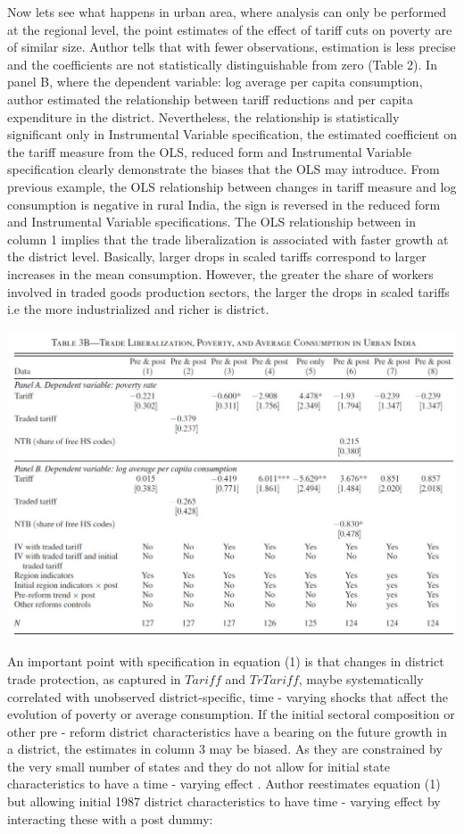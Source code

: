 \documentclass[a4paper,12pt]{article}
\begin{document}
Now lets see what happens in urban area, where analysis can only be performed at the regional level, the point estimates of the effect of  tariff cuts on poverty are of similar size. Author tells that with fewer observations, estimation is less precise and the coefficients are not statistically distinguishable from zero (Table 2). In panel B, where the dependent variable: log average per capita consumption, author estimated the relationship between tariff reductions and per capita expenditure in the district. Nevertheless, the relationship is statistically significant only in Instrumental Variable specification, the estimated coefficient on the tariff measure from the OLS, reduced form and Instrumental Variable specification clearly demonstrate the biases that the OLS may introduce. From previous example, the OLS relationship between changes in tariff measure and log consumption is negative in rural India, the sign is reversed in the reduced form and Instrumental Variable specifications. The OLS relationship between in column 1 implies that the trade liberalization is associated with faster growth at the district level. Basically, larger drops in scaled tariffs correspond to larger increases in the mean consumption. However, the greater the share of workers involved in traded goods production sectors, the larger the drops in scaled tariffs i.e the more industrialized and richer is district. 

\begin{table}[h]
\centering
\includegraphics[width=1\textwidth]{table3b.JPG}
\caption{\label{fig:Figure1}}
\end{table}


An important point with specification in equation (1) is that changes in district trade protection, as captured in $Tariff$ and $TrTariff$, maybe systematically correlated with unobserved district-specific, time - varying shocks that affect the evolution of poverty or average consumption. If the initial sectoral composition or other pre - reform district characteristics have a bearing on the future growth in a district, the estimates in column 3 may be biased. As they are constrained by the very small number of states and they do not allow for initial state characteristics to have a time - varying effect \cite{Hasan07} .   Author reestimates equation (1) but allowing  initial 1987 district characteristics to have time - varying effect by interacting these with a post dummy: 
\end{document}

